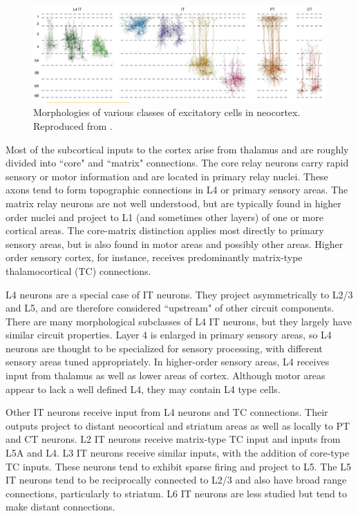 \begin{figure}[h]
    \centering
    \includegraphics[width=\textwidth]{images/neuroscience/cortical_morphologies.png}
    \caption{Morphologies of various classes of excitatory cells in neocortex. Reproduced from \cite{harris2015neocortical}.}
    \label{fig: cortical morphologies}
\end{figure}

Most of the subcortical inputs to the cortex arise from thalamus and are roughly divided into ``core" and ``matrix" connections. The core relay neurons carry rapid sensory or motor information and are located in primary relay nuclei. These axons tend to form topographic connections in L4 or primary sensory areas. The matrix relay neurons are not well understood, but are typically found in higher order nuclei and project to L1 (and sometimes other layers) of one or more cortical areas. The core-matrix distinction applies most directly to primary sensory areas, but is also found in motor areas and possibly other areas. Higher order sensory cortex, for instance, receives predominantly matrix-type thalamocortical (TC) connections. 

L4 neurons are a special case of IT neurons. They project asymmetrically to L2/3 and L5, and are therefore considered ``upstream" of other circuit components. There are many morphological subclasses of L4 IT neurons, but they largely have similar circuit properties. Layer 4 is enlarged in primary sensory areas, so L4 neurons are thought to be specialized for sensory processing, with different sensory areas tuned appropriately. In higher-order sensory areas, L4 receives input from thalamus as well as lower areas of cortex. Although motor areas appear to lack a well defined L4, they may contain L4 type cells. 

Other IT neurons receive input from L4 neurons and TC connections. Their outputs project to distant neocortical and striatum areas as well as locally to PT and CT neurons. L2 IT neurons receive matrix-type TC input and inputs from L5A and L4. L3 IT neurons receive similar inputs, with the addition of core-type TC inputs. These neurons tend to exhibit sparse firing and project to L5. The L5 IT neurons tend to be reciprocally connected to L2/3 and also have broad range connections, particularly to striatum. L6 IT neurons are less studied but tend to make distant connections. 

